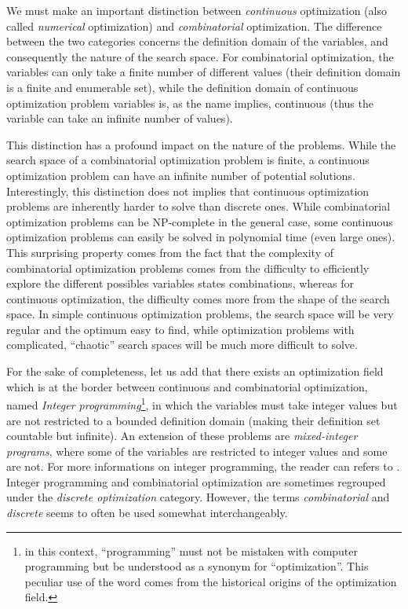 We must make an important distinction between \emph{continuous} optimization (also called \emph{numerical} optimization) and \emph{combinatorial} optimization. The difference between the two categories concerns the definition domain of the variables, and consequently the nature of the search space. For combinatorial optimization, the variables can only take a finite number of different values (their definition domain is a finite and enumerable set), while the definition domain of continuous optimization problem variables is, as the name implies, continuous (thus the variable can take an infinite number of values).

This distinction has a profound impact on the nature of the problems. While the search space of a combinatorial optimization problem is finite, a continuous optimization problem can have an infinite number of potential solutions. Interestingly, this distinction does not implies that continuous optimization problems are inherently harder to solve than discrete ones. While combinatorial optimization problems can be NP-complete in the general case, some continuous optimization problems can easily be solved in polynomial time (even large ones). This surprising property comes from the fact that the complexity of combinatorial optimization problems comes from the difficulty to efficiently explore the different possibles variables states combinations, whereas for continuous optimization, the difficulty comes more from the shape of the search space. In simple continuous optimization problems, the search space will be very regular and the optimum easy to find, while optimization problems with complicated, \enquote{chaotic} search spaces will be much more difficult to solve.

For the sake of completeness, let us add that there exists an optimization field which is at the border between continuous and combinatorial optimization, named \emph{Integer programming}\footnote{in this context, \enquote{programming} must not be mistaken with computer programming but be understood as a synonym for \enquote{optimization}. This peculiar use of the word comes from the historical origins of the optimization field.}, in which the variables must take integer values but are not restricted to a bounded definition domain (making their definition set countable but infinite). An extension of these problems are \emph{mixed-integer programs}, where some of the variables are restricted to integer values and some are not. For more informations on integer programming, the reader can refers to \cite{schrijver1998theory}. Integer programming and combinatorial optimization are sometimes regrouped under the \emph{discrete optimization} category. However, the terms \emph{combinatorial} and \emph{discrete} seems to often be used somewhat interchangeably.

